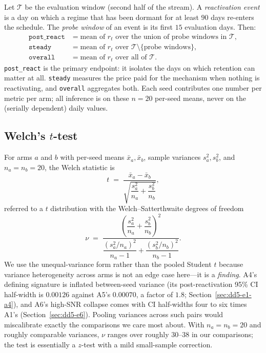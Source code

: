 \documentclass[11pt,a4paper]{article}
\theoremstyle{definition}
\theoremstyle{plain}
\begin{document}
Let $\mathcal{T}$ be the evaluation window (second half of the stream). A
\emph{reactivation event} is a day on which a regime that has been dormant
for at least $90$ days re-enters the schedule. The \emph{probe window} of an
event is its first $15$ evaluation days. Then:
\begin{align}
\texttt{post\_react} &= \text{mean of } r_t \text{ over the union of probe
windows in } \mathcal{T}, \label{eq:dd5-postreact}\\
\texttt{steady} &= \text{mean of } r_t \text{ over }
\mathcal{T} \setminus \{\text{probe windows}\}, \label{eq:dd5-steady}\\
\texttt{overall} &= \text{mean of } r_t \text{ over all of } \mathcal{T}.
\label{eq:dd5-overall}
\end{align}
\texttt{post\_react} is the primary endpoint: it isolates the days on which
retention can matter at all. \texttt{steady} measures the price paid for the
mechanism when nothing is reactivating, and \texttt{overall} aggregates both.
Each seed contributes one number per metric per arm; all inference is on
these $n=20$ per-seed means, never on the (serially dependent) daily values.

\subsection{Welch's $t$-test}
\label{sec:dd5-welch}

For arms $a$ and $b$ with per-seed means $\bar{x}_a, \bar{x}_b$, sample
variances $s_a^2, s_b^2$, and $n_a = n_b = 20$, the Welch statistic is
\begin{equation}
t \;=\; \frac{\bar{x}_a - \bar{x}_b}
{\sqrt{\dfrac{s_a^2}{n_a} + \dfrac{s_b^2}{n_b}}},
\label{eq:dd5-welch-t}
\end{equation}
referred to a $t$ distribution with the Welch--Satterthwaite degrees of
freedom
\begin{equation}
\nu \;=\;
\frac{\left(\dfrac{s_a^2}{n_a} + \dfrac{s_b^2}{n_b}\right)^{2}}
{\dfrac{(s_a^2/n_a)^2}{n_a - 1} + \dfrac{(s_b^2/n_b)^2}{n_b - 1}}.
\label{eq:dd5-welch-df}
\end{equation}
We use the unequal-variance form rather than the pooled Student $t$ because
variance heterogeneity across arms is not an edge case here---it is a
\emph{finding}. A4's defining signature is inflated between-seed variance
(its post-reactivation 95\% CI half-width is $0.00126$ against A5's
$0.00070$, a factor of $1.8$; Section~\ref{sec:dd5-e1-a4}), and A6's
high-SNR collapse comes with CI half-widths four to six times A1's
(Section~\ref{sec:dd5-e6}). Pooling variances across such pairs would
miscalibrate exactly the comparisons we care most about. With $n_a=n_b=20$
and roughly comparable variances, $\nu$ ranges over roughly $30$--$38$ in our
comparisons; the test is essentially a $z$-test with a mild small-sample
correction.
\end{document}

